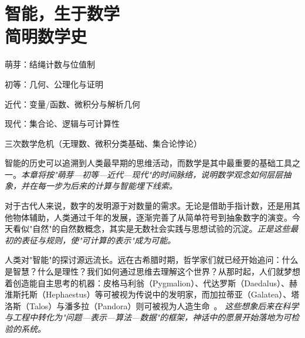 \chapter{智能，生于数学 \texorpdfstring{\\}{ }简明数学史}
\newenvironment{examplebox}
{\par\vspace{0.5em}\noindent\hrulefill\par\noindent{示例盒子：三跳链}\par\small}
{\par\noindent\hrulefill\vspace{0.5em}\normalsize\par}

\begin{introduction}
\item 萌芽：结绳计数与位值制
\item 初等：几何、公理化与证明
\item 近代：变量/函数、微积分与解析几何
\item 现代：集合论、逻辑与可计算性
\item 三次数学危机（无理数、微积分类基础、集合论悖论）
\end{introduction}

智能的历史可以追溯到人类最早期的思维活动，而数学是其中最重要的基础工具之一。\emph{本章将按"萌芽—初等—近代—现代"的时间脉络，说明数学观念如何层层抽象，并在每一步为后来的计算与智能埋下线索。}

对于古代人来说，数字的发明源于对数量的需求。无论是借助手指计数，还是用其他物体辅助，人类通过千年的发展，逐渐完善了从简单符号到抽象数字的演变。今天看似"自然"的自然数概念，其实是无数社会实践与思想试验的沉淀。\emph{正是这些最初的表征与规则，使"可计算的表示"成为可能。}

人类对"智能"的探讨源远流长。远在古希腊时期，哲学家们就已经开始追问：什么是智慧？什么是理性？我们如何通过思维去理解这个世界？从那时起，人们就梦想着创造能自主思考的机器：皮格马利翁（Pygmalion）、代达罗斯（Daedalus）、赫淮斯托斯（Hephaestus）等可被视为传说中的发明家，而加拉蒂亚（Galatea）、塔洛斯（Talos）与潘多拉（Pandora）则可被视为人造生命~{\cite{OvidMartin2004,Sparkes1996,Tandy1997}}。 \emph{这些想象后来在科学与工程中转化为"问题—表示—算法—数据"的框架，神话中的愿景开始落地为可检验的系统。}

